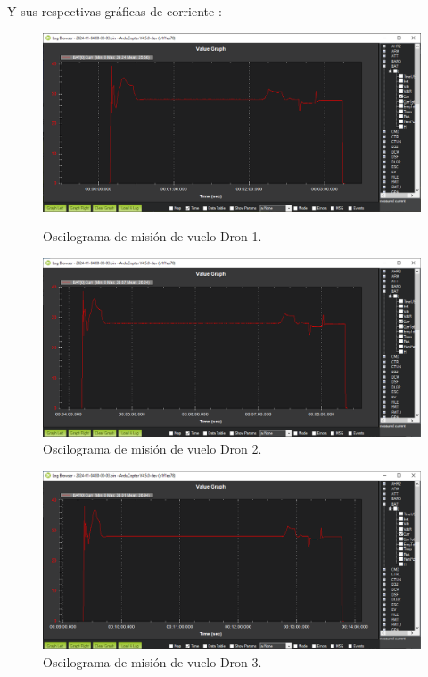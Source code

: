 Y sus respectivas gráficas de corriente :

\begin{figure}[H]
    \centering
    \includegraphics[width=0.9\linewidth]{imagenes/corr_2_1.png}
    \caption{Oscilograma de misión de vuelo Dron 1.}
\vspace{1cm}
 \centering
    \includegraphics[width=0.9\linewidth]{imagenes/corr_2_2.png}
    \caption{Oscilograma de misión de vuelo Dron 2.}
\end{figure}
\newpage
\begin{figure}[H]    
    \centering
    \includegraphics[width=0.9\linewidth]{imagenes/corr_2_3.png}
    \caption{Oscilograma de misión de vuelo Dron 3.}
\end{figure}




\endinput